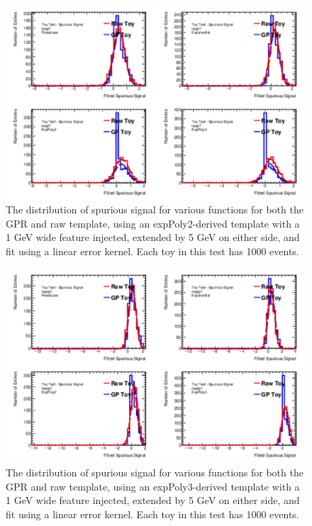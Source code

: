 \begin{figure} 
\begin{center}
  \includegraphics[width=\textwidth]{figures/background/gpr/validation/linear/ToyTest_FitSigVals_lowpT_1000_Sig_1s}   
\caption{The distribution of spurious signal for various functions for both the GPR and raw template, using an expPoly2-derived template with a 1 GeV wide feature injected, extended by 5 GeV on either side, and fit using a linear error kernel. Each toy in this test has 1000 events.}
\label{fig:linearkernel_lowpt_1000_Sig_1s}
\end{center}
\end{figure}

\begin{figure} 
\begin{center}
  \includegraphics[width=\textwidth]{figures/background/gpr/validation/linear/ToyTest_FitSigVals_medpT_1000_Sig_1s}   
\caption{The distribution of spurious signal for various functions for both the GPR and raw template, using an expPoly3-derived template with a 1 GeV wide feature injected, extended by 5 GeV on either side, and fit using a linear error kernel. Each toy in this test has 1000 events.}
\label{fig:linearkernel_medpt_1000_Sig_1s}
\end{center}
\end{figure}

